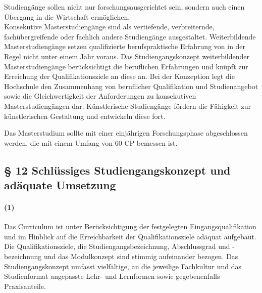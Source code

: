 \documentclass[a4paper]{scrartcl}
\begin{document}
\textcolor{Bernd}{\textbf{\cite{PROT: WiSe2015-RL}} Studiengänge sollen nicht nur forschungsausgerichtet sein, sondern auch einen Übergang in die Wirtschaft ermöglichen.}\\

Konsekutive Masterstudiengänge sind als vertiefende, verbreiternde, fachübergreifende oder fachlich andere Studiengänge ausgestaltet.
Weiterbildende Masterstudiengänge setzen qualifizierte berufspraktische Erfahrung von in der Regel nicht unter einem Jahr voraus. Das Studiengangskonzept weiterbildender Masterstudiengänge berücksichtigt die beruflichen Erfahrungen und knüpft zur Erreichung der Qualifikationsziele an diese an. Bei der Konzeption legt die Hochschule den Zusammenhang von beruflicher Qualifikation und Studienangebot sowie die Gleichwertigkeit der Anforderungen zu konsekutiven Masterstudiengängen dar. Künstlerische Studiengänge fördern die Fähigkeit zur künstlerischen Gestaltung und entwickeln diese fort.

\textcolor{Bernd}{\textbf{\cite{RESO: SoSe2010-BaMa}} Das Masterstudium sollte mit einer einjährigen Forschungsphase abgeschlossen werden, die mit einem Umfang von 60 CP bemessen ist.}\\


\subsection{§ 12 Schlüssiges Studiengangskonzept und adäquate Umsetzung}
\paragraph{(1)} Das Curriculum ist unter Berücksichtigung der festgelegten Eingangsqualifikation und im Hinblick auf die Erreichbarkeit der Qualifikationsziele adäquat aufgebaut. Die Qualifikationsziele, die Studiengangsbezeichnung, Abschlussgrad und -bezeichnung und das Modulkonzept sind stimmig aufeinander bezogen. Das Studiengangskonzept umfasst vielfältige, an die jeweilige Fachkultur und das Studienformat angepasste Lehr- und Lernformen sowie gegebenenfalls Praxisanteile. \\
\end{document}

